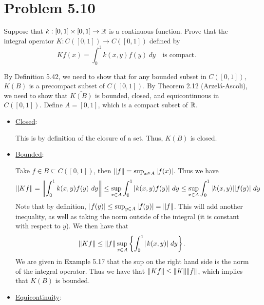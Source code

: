 \section{Problem 5.10}
Suppose that $k: [0, 1]\times [0, 1] \rightarrow \mathbb{R}$ is a continuous function. Prove that the integral operator $K : C([0, 1]) \rightarrow C([0, 1])$ defined by 
\[Kf(x) = \int_0^1 k(x, y) f(y) \ dy \quad \text{is compact.}\]
\partbreak
\begin{solution}

    By Definition 5.42, we need to show that for any bounded subset in $C([0, 1])$, $K(B)$ is a precompact subset of $C([0, 1])$. By Theorem 2.12 (Arzel\'a-Ascoli), we need to show that $\overline{K(B)}$ is bounded, closed, and equicontinuous in $C([0, 1])$. Define $A = [0, 1]$, which is a compact subset of $\mathbb{R}$.
    \begin{itemize}[-]
        \item \underline{Closed}: 

        \hop
        This is by definition of the closure of a set. Thus, $\overline{K(B)}$ is closed. 
        \item \underline{Bounded}: 

        \hop
        Take $f \in B \subseteq C([0, 1])$, then $\norm{f} = \sup_{x \in A} |f(x)|$. Thus we have
        \[\norm{Kf} = \norm{\int_0^1 k(x, y)f(y) \ dy} \leq \sup_{x \in A} \int_0^1 |k(x, y)f(y)| \ dy \leq \sup_{x \in A}\int_0^1 |k(x, y)||f(y)| \ dy\]
        Note that by definition, $|f(y)| \leq \sup_{y \in A} |f(y)| = \norm{f}$. This will add another inequality, as well as taking the norm outside of the integral (it is constant with respect to $y$). We then have that 
        \[\norm{Kf} \leq \norm{f}\sup_{x \in A}\left\{\int_0^1 |k(x, y)| \ dy\right\}.\]
        We are given in Example 5.17 that the sup on the right hand side is the norm of the integral operator. Thus we have that $\norm{Kf} \leq \norm{K}\norm{f}$, which implies that $\overline{K(B)}$ is bounded.
        \item \underline{Equicontinuity}:


\end{itemize}
\end{solution}
